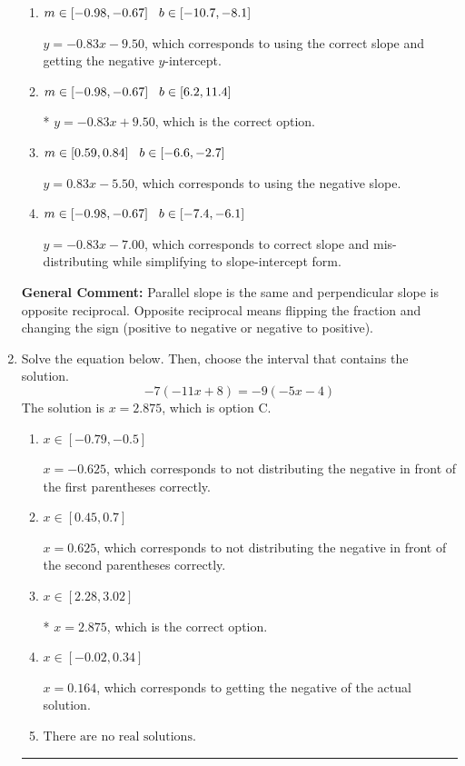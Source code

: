 \documentclass{extbook}[14pt]
\newcommand{\litem}[1]{\item #1

\rule{\textwidth}{0.4pt}}
\begin{document}
\begin{enumerate}
{\begin{enumerate}[label=\Alph*.]
 $y = -1.20x + 9.50$, which corresponds to using the reciprocal slope $(1/m)$.
\item \( m \in [-0.98, -0.67] \hspace*{3mm} b \in [-10.7, -8.1] \)

 $y = -0.83x - 9.50$, which corresponds to using the correct slope and getting the negative $y$-intercept.
\item \( m \in [-0.98, -0.67] \hspace*{3mm} b \in [6.2, 11.4] \)

* $y = -0.83x + 9.50$, which is the correct option.
\item \( m \in [0.59, 0.84] \hspace*{3mm} b \in [-6.6, -2.7] \)

 $y = 0.83x - 5.50$, which corresponds to using the negative slope.
\item \( m \in [-0.98, -0.67] \hspace*{3mm} b \in [-7.4, -6.1] \)

 $y = -0.83x - 7.00$, which corresponds to correct slope and mis-distributing while simplifying to slope-intercept form.
\end{enumerate}

\textbf{General Comment:} Parallel slope is the same and perpendicular slope is opposite reciprocal. Opposite reciprocal means flipping the fraction and changing the sign (positive to negative or negative to positive).
}
\litem{
Solve the equation below. Then, choose the interval that contains the solution.
\[ -7(-11x + 8) = -9(-5x -4) \]The solution is \( x = 2.875 \), which is option C.\begin{enumerate}[label=\Alph*.]
\item \( x \in [-0.79, -0.5] \)

$x = -0.625$, which corresponds to not distributing the negative in front of the first parentheses correctly.
\item \( x \in [0.45, 0.7] \)

$x = 0.625$, which corresponds to not distributing the negative in front of the second parentheses correctly.
\item \( x \in [2.28, 3.02] \)

* $x = 2.875$, which is the correct option.
\item \( x \in [-0.02, 0.34] \)

$x = 0.164$, which corresponds to getting the negative of the actual solution.
\item \( \text{There are no real solutions.} \)


\end{enumerate}}
\end{enumerate}
\end{document}
